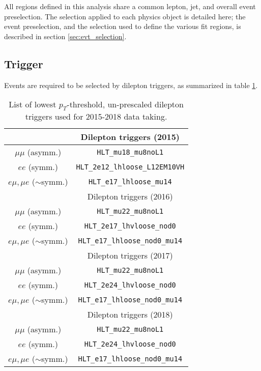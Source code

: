
All regions defined in this analysis share a common lepton, jet, and overall event preselection. The selection applied to each physics object is detailed here; the event preselection, and the selection used to define the various fit regions, is described in section \ref{sec:evt_selection}.

\subsection{Trigger}

Events are required to be selected by dilepton triggers, as summarized in table \ref{tbl:trigger}. 

\begin{table}[h!]
 \begin{center}
   \begin{tabular}{cc}
     \toprule
                  & Dilepton triggers (2015) \\
     \midrule
      $\mu\mu$ (asymm.)          & \verb!HLT_mu18_mu8noL1! \\
      $ee$ (symm.)               & \verb!HLT_2e12_lhloose_L12EM10VH! \\
      $e\mu,\mu e$ ($\sim$symm.) & \verb!HLT_e17_lhloose_mu14! \\
     \bottomrule
                       & Dilepton triggers (2016) \\
     \midrule
      $\mu\mu$ (asymm.)                   & \verb!HLT_mu22_mu8noL1! \\
      $ee$ (symm.)                        & \verb!HLT_2e17_lhvloose_nod0! \\
      $e\mu,\mu e$ ($\sim$symm.)          & \verb!HLT_e17_lhloose_nod0_mu14! \\
     \bottomrule

                  & Dilepton triggers (2017) \\
     \midrule
      $\mu\mu$ (asymm.)                   & \verb!HLT_mu22_mu8noL1! \\
      $ee$ (symm.)                        & \verb!HLT_2e24_lhvloose_nod0! \\
      $e\mu,\mu e$ ($\sim$symm.)          & \verb!HLT_e17_lhloose_nod0_mu14! \\
     \bottomrule
                  & Dilepton triggers (2018) \\
     \midrule
      $\mu\mu$ (asymm.)                   & \verb!HLT_mu22_mu8noL1! \\
      $ee$ (symm.)                        & \verb!HLT_2e24_lhvloose_nod0! \\
      $e\mu,\mu e$ ($\sim$symm.)          & \verb!HLT_e17_lhloose_nod0_mu14! \\ 
      \bottomrule
   \end{tabular}
   \caption{\label{tbl:trigger} List of lowest $p_{T}$-threshold, un-prescaled dilepton triggers used for 2015-2018 data taking.}
 \end{center}
\end{table}

